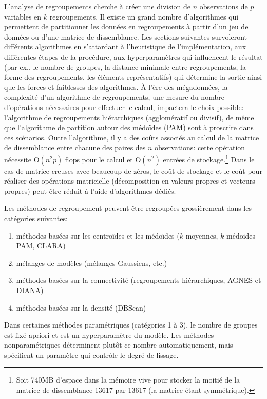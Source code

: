 \documentclass[
  11pt,
  letterpaper,
]{scrbook}
\providecommand{\tightlist}{%
  \setlength{\itemsep}{0pt}\setlength{\parskip}{0pt}}\usepackage{longtable,booktabs,array}
\theoremstyle{definition}
\theoremstyle{remark}
\begin{document}
L'analyse de regroupements cherche à créer une division de \(n\)
observations de \(p\) variables en \(k\) regroupements. Il existe un
grand nombre d'algorithmes qui permettent de partitionner les données en
regroupements à partir d'un jeu de données ou d'une matrice de
dissemblance. Les sections suivantes survoleront différents algorithmes
en s'attardant à l'heuristique de l'implémentation, aux différentes
étapes de la procédure, aux hyperparamètres qui influencent le résultat
(par ex., le nombre de groupes, la distance minimale entre
regroupements, la forme des regroupements, les éléments représentatifs)
qui détermine la sortie ainsi que les forces et faiblesses des
algorithmes. À l'ère des mégadonnées, la complexité d'un algorithme de
regroupements, une mesure du nombre d'opérations nécessaires pour
effectuer le calcul, impactera le choix possible: l'algorithme de
regroupements hiérarchiques (agglomératif ou divisif), de même que
l'algorithme de partition autour des médoïdes (PAM) sont à proscrire
dans ces scénarios. Outre l'algorithme, il y a des coûts associés au
calcul de la matrice de dissemblance entre chacune des paires des \(n\)
observations: cette opération nécessite \(\mathrm{O}(n^2p)\) flops pour
le calcul et \(\mathrm{O}(n^2)\) entrées de stockage.\footnote{Soit
  740MB d'espace dans la mémoire vive pour stocker la moitié de la
  matrice de dissemblance 13617 par 13617 (la matrice étant
  symmétrique).} Dans le cas de matrice creuses avec beaucoup de zéros,
le coût de stockage et le coût pour réaliser des opérations matricielle
(décomposition en valeurs propres et vecteurs propres) peut être réduit
à l'aide d'algorithmes dédiés.

Les méthodes de regroupement peuvent être regroupées grossièrement dans
les catégories suivantes:

\begin{enumerate}
\def\labelenumi{\arabic{enumi}.}
\tightlist
\item
  méthodes basées sur les centroïdes et les médoïdes (\(k\)-moyennes,
  \(k\)-médoides PAM, CLARA)
\item
  mélanges de modèles (mélanges Gaussiens, etc.)
\item
  méthodes basées sur la connectivité (regroupements hiérarchiques,
  AGNES et DIANA)
\item
  méthodes basées sur la densité (DBScan)
\end{enumerate}

Dans certaines méthodes paramétriques (catégories 1 à 3), le nombre de
groupes est fixé apriori et est un hyperparamètre du modèle. Les
méthodes nonparamétriques déterminent plutôt ce nombre automatiquement,
mais spécifient un paramètre qui contrôle le degré de lissage.
\end{document}
